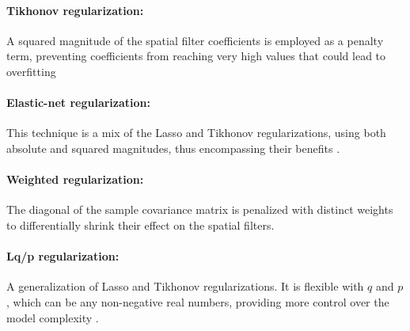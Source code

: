 
\paragraph{Tikhonov regularization:} A squared magnitude of the spatial filter coefficients is employed as a penalty term, preventing coefficients from reaching very high values that could lead to overfitting \cite{fauzi2019energy}


\paragraph{Elastic-net regularization:} This technique is a mix of the Lasso and Tikhonov regularizations, using both absolute and squared magnitudes, thus encompassing their benefits \cite{gu2021eeg}.


\paragraph{Weighted regularization:} The diagonal of the sample covariance matrix is penalized with distinct weights to differentially shrink their effect on the spatial filters.\cite{deng2020local}


\paragraph{Lq/p regularization:} A generalization of Lasso and Tikhonov regularizations. It is flexible with $q$ and $p$, which can be any non-negative real numbers, providing more control over the model complexity \cite{cai2021single}.

